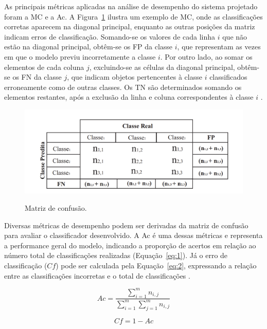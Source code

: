 As principais métricas aplicadas na análise de desempenho do sistema projetado foram a \ac{MC} e a  \ac{Ac}. A Figura~\ref{FIG:matriz} ilustra um exemplo de \ac{MC}, onde as classificações corretas aparecem na diagonal principal, enquanto as outras posições da matriz indicam erros de classificação. Somando-se os valores de cada linha $i$ que não estão na diagonal principal, obtêm-se os \ac{FP} da classe $i$, que representam as vezes em que o modelo previu incorretamente a classe $i$. Por outro lado, ao somar os elementos de cada coluna $j$, excluindo-se as células da diagonal principal, obtêm-se os \ac{FN} da classe $j$, que indicam objetos pertencentes à classe $i$ classificados erroneamente como de outras classes. Os \ac{TN} são determinados somando os elementos restantes, após a exclusão da linha e coluna correspondentes à classe $i$ \cite{silva2022sistema}.

\begin{figure}[!h]
	\centering
	\caption{Matriz de confusão.}
	\includegraphics[width=13cm]{figuras/confusion1.png}\\
	\label{FIG:matriz}
\end{figure}

Diversas métricas de desempenho podem ser derivadas da matriz de confusão para avaliar o classificador desenvolvido. A \ac{Ac} é uma dessas métricas e representa a performance geral do modelo, indicando a proporção de acertos em relação ao número total de classificações realizadas (Equação~\ref{eq:1}). Já o erro de classificação ($Cf$) pode ser calculada pela Equação~\ref{eq:2}, expressando a relação entre as classificações incorretas e o total de classificações \cite{silva2022sistema}.   

\begin{equation}
\label{eq:1}
Ac = \frac{\sum_{i=1}^{m} n_{i,j}}{\sum_{i=1}^{m}\sum_{j=1}^{m}n_{i,j}}
\end{equation}

\begin{equation}
\label{eq:2}
Cf = 1 - Ac
\end{equation}


